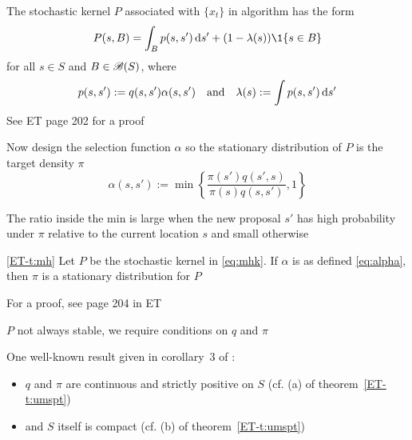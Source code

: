 \begin{frame}

    \vspace{2em}
    The stochastic kernel $P$ associated with $\{x_t\}$ in algorithm
    has the form
        \begin{equation}
            \label{eq:mhk}
            P(s, B) = \int_B p(s, s') \diff s' + (1 - \lambda(s)) \1\{s \in B\}
        \end{equation}
        for all $s \in S$ and $B \in \mathscr B(S)$, where
        \begin{equation*}
            p(s, s') := q(s, s') \alpha(s, s')
            \quad \text{and} \quad
            \lambda(s) := \int p(s, s') \mathop{}\!\mathrm{d} s' 
        \end{equation*}
    See ET page 202 for a proof 

\end{frame}
    
\begin{frame}

    \vspace{2em}
    Now design the selection function $\alpha$ so the stationary
    distribution of $P$ is the target density $\pi$
    \begin{equation}
        \label{eq:alpha}
        \alpha(s, s') 
        := 
            \min \left\{ 
                \frac{\pi(s') q(s', s)}{\pi(s) q(s,s')}
                , 1
                 \right\}
    \end{equation}
    
    \vspace{2em}
    The ratio inside the min is
    large when the new proposal $s'$ has high probability under $\pi$ relative to
    the current location $s$ and small otherwise 

\end{frame}
    
\begin{frame}

    \vspace{2em}
    \Thm\textcolor{Brown}{\eqref{ET-t:mh}}
    Let $P$ be the stochastic kernel in \eqref{eq:mhk}.  If $\alpha$ is as
    defined \eqref{eq:alpha}, then $\pi$ is a stationary distribution for $P$
    
    For a proof, see page 204 in ET
    
    $P$ not always stable, we require conditions on $q$ and $\pi$
    
    One well-known result given in
    corollary~3 of \cite{tierney1994markov}:
    \begin{itemize}
    \item $q$ and $\pi$ are
    continuous and strictly positive on $S$ (cf. (a) of
    theorem~\ref{ET-t:umspt})
    \item and $S$ itself is compact (cf. (b) of  theorem~\ref{ET-t:umspt})
    \end{itemize}
  
\end{frame}
    
